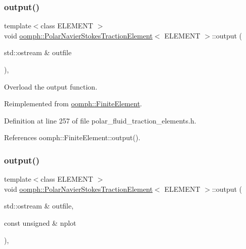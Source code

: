 \subsubsection{\texorpdfstring{output()}{output()}\hspace{0.1cm}{\footnotesize\ttfamily [1/2]}}
{\footnotesize\ttfamily template$<$class E\+L\+E\+M\+E\+NT $>$ \\
void \hyperlink{classoomph_1_1PolarNavierStokesTractionElement}{oomph\+::\+Polar\+Navier\+Stokes\+Traction\+Element}$<$ E\+L\+E\+M\+E\+NT $>$\+::output (\begin{DoxyParamCaption}\item[{std\+::ostream \&}]{outfile }\end{DoxyParamCaption})\hspace{0.3cm}{\ttfamily [inline]}, {\ttfamily [virtual]}}



Overload the output function. 



Reimplemented from \hyperlink{classoomph_1_1FiniteElement_a2ad98a3d2ef4999f1bef62c0ff13f2a7}{oomph\+::\+Finite\+Element}.



Definition at line 257 of file polar\+\_\+fluid\+\_\+traction\+\_\+elements.\+h.



References oomph\+::\+Finite\+Element\+::output().

\mbox{\label{classoomph_1_1PolarNavierStokesTractionElement_af52b911eda2c01d9d124ad29d9be1004}} 
\subsubsection{\texorpdfstring{output()}{output()}\hspace{0.1cm}{\footnotesize\ttfamily [2/2]}}
{\footnotesize\ttfamily template$<$class E\+L\+E\+M\+E\+NT $>$ \\
void \hyperlink{classoomph_1_1PolarNavierStokesTractionElement}{oomph\+::\+Polar\+Navier\+Stokes\+Traction\+Element}$<$ E\+L\+E\+M\+E\+NT $>$\+::output (\begin{DoxyParamCaption}\item[{std\+::ostream \&}]{outfile,  }\item[{const unsigned \&}]{nplot }\end{DoxyParamCaption})\hspace{0.3cm}{\ttfamily [inline]}, {\ttfamily [virtual]}}



